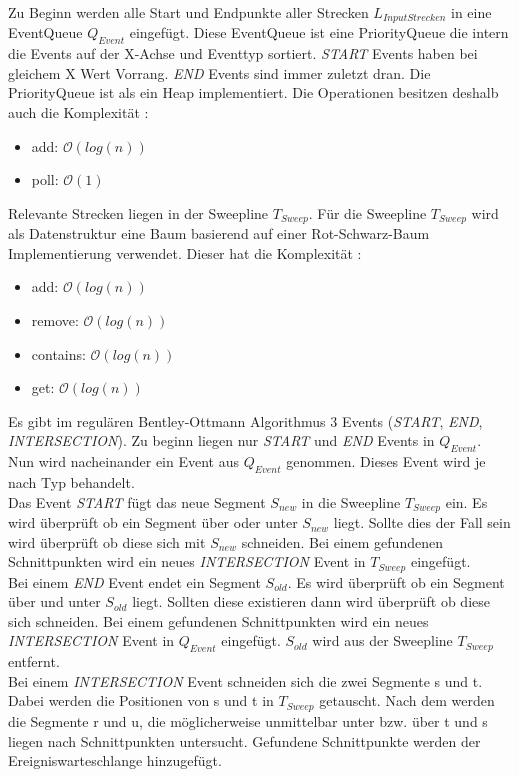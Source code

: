 \documentclass[conference]{IEEEtran}
\begin{document}
	Zu Beginn werden alle Start und Endpunkte aller Strecken $L_{InputStrecken}$ in eine EventQueue $Q_{Event}$ eingefügt. Diese EventQueue ist eine PriorityQueue die intern die Events auf der X-Achse und Eventtyp sortiert. \textit{START} Events haben bei gleichem X Wert Vorrang. \textit{END} Events sind immer zuletzt dran. Die PriorityQueue ist als ein Heap implementiert. Die Operationen besitzen deshalb auch die Komplexität \cite{b2}:
	\begin{itemize}
		\item add: $\mathcal{O}(log(n))$
		\item poll: $\mathcal{O}(1)$
	\end{itemize}
	Relevante Strecken liegen in der Sweepline $T_{Sweep}$.
	Für die Sweepline $T_{Sweep}$ wird als Datenstruktur eine Baum basierend auf einer Rot-Schwarz-Baum Implementierung verwendet. Dieser hat die Komplexität \cite{b1}:
	\begin{itemize}
		\item add: $\mathcal{O}(log(n))$
		\item remove: $\mathcal{O}(log(n))$
		\item contains: $\mathcal{O}(log(n))$
		\item get: $\mathcal{O}(log(n))$
	\end{itemize}
	Es gibt im regulären Bentley-Ottmann Algorithmus 3 Events (\textit{START}, \textit{END}, \textit{INTERSECTION}).
	Zu beginn liegen nur \textit{START} und \textit{END} Events in $Q_{Event}$.\\
	Nun wird nacheinander ein Event aus $Q_{Event}$ genommen. Dieses Event wird je nach Typ behandelt.\\
	Das Event \textit{START} fügt das neue Segment $S_{new}$ in die Sweepline $T_{Sweep}$ ein.
	Es wird überprüft ob ein Segment über oder unter $S_{new}$ liegt. Sollte dies der Fall sein wird überprüft ob diese sich mit $S_{new}$ schneiden. Bei einem gefundenen Schnittpunkten wird ein neues \textit{INTERSECTION} Event in $T_{Sweep}$ eingefügt.\\
	Bei einem \textit{END} Event endet ein Segment $S_{old}$. Es wird überprüft ob ein Segment über und unter $S_{old}$ liegt. Sollten diese existieren dann wird überprüft ob diese sich schneiden. Bei einem gefundenen Schnittpunkten wird ein neues \textit{INTERSECTION} Event in $Q_{Event}$ eingefügt. $S_{old}$ wird aus der Sweepline $T_{Sweep}$ entfernt.\\
	Bei einem \textit{INTERSECTION} Event schneiden sich die zwei Segmente s und t. Dabei werden die Positionen von s und t in $T_{Sweep}$ getauscht. Nach dem werden die Segmente r und u, die möglicherweise unmittelbar unter bzw. über t und s liegen nach Schnittpunkten untersucht. Gefundene Schnittpunkte werden der Ereigniswarteschlange hinzugefügt.
\end{document}
